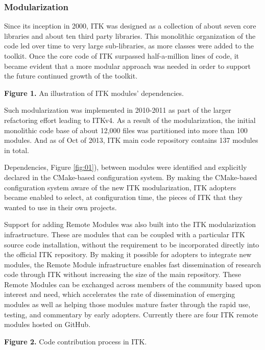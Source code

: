 \documentclass{frontiersENG} %
\begin{document}
\subsubsection{Modularization}

Since its inception in 2000, ITK was designed as a collection of about seven
core libraries and about ten third party libraries.  This monolithic
organization of the code led over time to very large sub-libraries, as more
classes were added to the toolkit. Once the core code of ITK surpassed
half-a-million lines of code, it became evident that a more modular approach
was needed in order to support the future continued growth of the toolkit.

\textbf{Figure 1. }{An illustration of ITK modules' dependencies.}\label{fig:01}

Such modularization was implemented in 2010-2011 as part of the larger
refactoring effort leading to ITKv4.  As a result of the modularization, the
initial monolithic code base of about 12,000 files was partitioned into more
than 100 modules.  And as of Oct of 2013, ITK main code repository contains
137 modules in total.

Dependencies, Figure \ref{fig:01}), between modules were identified and
explicitly declared in the CMake-based \cite{CMake} configuration system. By making the
CMake-based configuration system aware of the new ITK modularization, ITK
adopters became enabled to select, at configuration time, the pieces of ITK
that they wanted to use in their own projects.

Support for adding Remote Modules was also built into the ITK modularization
infrastructure. These are modules that can be coupled with a particular
ITK source code installation, without the requirement to be incorporated directly into
the official ITK repository. By making it possible for adopters to integrate
new modules, the Remote Module infrastructure enables fast
dissemination of research code through ITK without increasing the size of the
main repository. These Remote Modules can be exchanged across members of the
community based upon interest and need, which accelerates the rate
of dissemination of emerging modules as well as helping those modules mature
faster through the rapid use, testing, and commentary by early adopters. Currently
there are four ITK remote modules hosted on GitHub.

\textbf{Figure 2. }{Code contribution process in ITK.}\label{fig:02}
\end{document}
